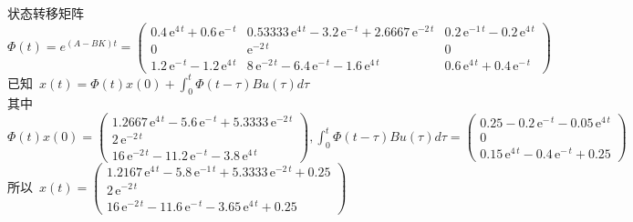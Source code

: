 \documentclass[a4paper]{article}
\begin{document}
\mbox{状态转移矩阵 }$ \Phi(t)=e^{(A-BK)t}=\left(\begin{array}{ccc} 0.4\, \mathrm{e}^{4\, t} + 0.6\, \mathrm{e}^{-\, t} & 0.53333\, \mathrm{e}^{4\, t} - 3.2\, \mathrm{e}^{-\, t} + 2.6667\, \mathrm{e}^{- 2\, t} & 0.2\, \mathrm{e}^{- 1\, t} - 0.2\, \mathrm{e}^{4\, t}\\ 0 & \mathrm{e}^{- 2\, t} & 0\\ 1.2\, \mathrm{e}^{-\, t} - 1.2\, \mathrm{e}^{4\, t} & 8\, \mathrm{e}^{- 2\, t} - 6.4\, \mathrm{e}^{-\, t} - 1.6\, \mathrm{e}^{4\, t} & 0.6\, \mathrm{e}^{4\, t} + 0.4\, \mathrm{e}^{-\, t} \end{array}\right) $\\
\mbox{已知 }$x(t)=\Phi(t)x(0)+\int_{0}^{t}\Phi(t-\tau)Bu(\tau)d\tau $ \\
\mbox{其中 }$\Phi(t)x(0)=\left(\begin{array}{c} 1.2667\, \mathrm{e}^{4\, t} - 5.6\, \mathrm{e}^{-\, t} + 5.3333\, \mathrm{e}^{- 2\, t}\\ 2\, \mathrm{e}^{- 2\, t}\\ 16\, \mathrm{e}^{- 2\, t} - 11.2\, \mathrm{e}^{-\, t} - 3.8\, \mathrm{e}^{4\, t} \end{array}\right), 
\int_{0}^{t}\Phi(t-\tau)Bu(\tau)d\tau= \left(\begin{array}{c} 0.25 - 0.2\, \mathrm{e}^{-\, t} - 0.05\, \mathrm{e}^{4\, t}\\ 0\\ 0.15\, \mathrm{e}^{4\, t} - 0.4\, \mathrm{e}^{-\, t} + 0.25 \end{array}\right) $ \\
\mbox{所以 }$x(t)=\left(\begin{array}{c} 1.2167\, \mathrm{e}^{4\, t} - 5.8\, \mathrm{e}^{- 1\, t} + 5.3333\, \mathrm{e}^{- 2\, t} + 0.25\\ 2\, \mathrm{e}^{- 2\, t}\\ 16\, \mathrm{e}^{- 2\, t} - 11.6\, \mathrm{e}^{-\, t} - 3.65\, \mathrm{e}^{4\, t} + 0.25 \end{array}\right)$
\end{document}
